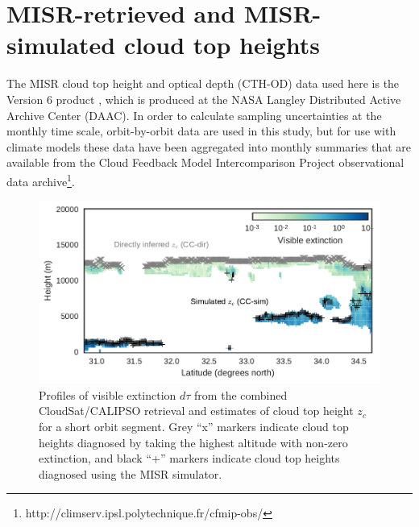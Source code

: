 \section{MISR-retrieved and MISR-simulated cloud top
heights}\label{sec:misrRetrievals}

The MISR cloud top height and optical depth (CTH-OD) data used here is
the Version 6 product \citep{marchand_et_al_2010}, which is produced at
the NASA Langley Distributed Active Archive Center (DAAC). In order to
calculate sampling uncertainties at the monthly time scale,
orbit-by-orbit data are used in this study, but for use with climate
models these data have been aggregated into monthly summaries that are
available from the Cloud Feedback Model Intercomparison Project
\citep[CFMIP;][]{webb_et_al_2016} observational data archive\footnote{http://climserv.ipsl.polytechnique.fr/cfmip-obs/}.

\begin{figure}[tp]
\centering
\includegraphics{graphics/misr_sim_example.pdf}
\caption{\label{fig:misr_sim_example}Profiles of visible extinction
\(d\tau\) from the combined CloudSat/CALIPSO retrieval and estimates of
cloud top height \(z_c\) for a short orbit segment. Grey ``x'' markers
indicate cloud top heights diagnosed by taking the highest altitude with
non-zero extinction, and black ``+'' markers indicate cloud top heights
diagnosed using the MISR simulator.}\label{fig:misrux5fsimux5fexample}
\end{figure}

